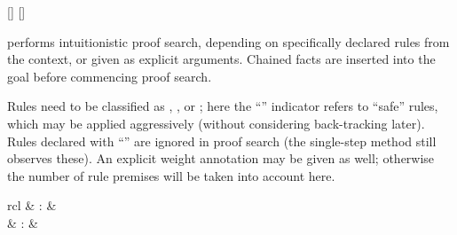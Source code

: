 \begin{isabellebody}
\begin{isamarkuptext}
  \begin{railoutput}
[]
\rail@plus
{}
[]
\rail@endplus
\rail@end
\end{railoutput}


  \begin{description}

  \item \hyperlink{method.HOL.iprover}{\mbox{}} performs intuitionistic proof search,
  depending on specifically declared rules from the context, or given
  as explicit arguments.  Chained facts are inserted into the goal
  before commencing proof search.

  Rules need to be classified as \hyperlink{attribute.Pure.intro}{\mbox{}},
  \hyperlink{attribute.Pure.elim}{\mbox{}}, or \hyperlink{attribute.Pure.dest}{\mbox{}}; here the
  ``'' indicator refers to ``safe'' rules, which may be
  applied aggressively (without considering back-tracking later).
  Rules declared with ``'' are ignored in proof search (the
  single-step \hyperlink{method.Pure.rule}{\mbox{}} method still observes these).  An
  explicit weight annotation may be given as well; otherwise the
  number of rule premises will be taken into account here.

  \end{description}%
\end{isamarkuptext}%
\isamarkuptrue%
%
\isamarkuptrue%
%
\begin{isamarkuptext}%
\begin{matharray}{rcl}
    \hypertarget{method.HOL.meson}{\hyperlink{method.HOL.meson}{\mbox{}}} & : &  \\
    \hypertarget{method.HOL.metis}{\hyperlink{method.HOL.metis}{\mbox{}}} & : &  \\
  \end{matharray}


\end{isamarkuptext}
\end{isabellebody}
